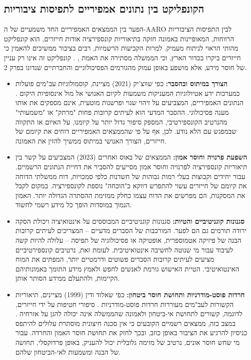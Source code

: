 \documentclass[12pt,a4paper]{article}
\begin{document}
\subsection{הקונפליקט בין נתונים אמפיריים לתפיסות ציבוריות}

הפער בין הממצאים האמפיריים החד משמעיים של ה-AARO לבין התפיסות הציבוריות הרווחות, המאופיינות באמונה חזקה בתיאוריות קונספירציה אודות חייזרים, הוא קונפליקט מהותי הראוי לניתוח מעמיק. למרות הקביעות הרשמיות, רבים בציבור ממשיכים להאמין כי חייזרים ביקרו בכדור הארץ, וכי הממשלה מסתירה את האמת \cite{aaro2024misidentification}, \cite{aaro2024noevidence}. קונפליקט זה אינו רק עניין של חוסר מידע, אלא מושפע באופן עמוק מהגורמים הפסיכולוגיים והחברתיים שנדונו בפרק 2.

\begin{itemize}
    \item \textbf{הצורך במיתוס ובהסבר:} כפי שווצ'יק (2021) מציינת, קוסמולוגיות עב"מים פועלות כמערכות ידע אטיולוגיות המעניקות משמעות לקיום האנושי אל מול אינסופיות היקום \cite{wojcik2021cosmologies}. הנתונים האמפיריים, המצביעים על זיהוי שגוי ופרשנות מוטעית, אינם מספקים את אותו מענה פסיכולוגי. ההסבר המדעי הוא לעיתים קרובות פחות "מרתק" או "משמעותי" מהנרטיב הקונספירטיבי, המספק סיפור גדול יותר על קיומנו, על האיום או התקווה שבמפגש עם הלא נודע. לכן, אף על פי שהממצאים האמפיריים דוחים את קיומם של חייזרים, הצורך האנושי במיתוס ממשיך להזין את האמונה.
    \item \textbf{השפעת פרנויה וחוסר אמון:} הממצאים של באוס ואחרים (2023) המצביעים על קשר בין תיאוריות קונספירציה לפרנויה וחוסר אמון \cite{bowes2023conspiracy} מסייעים להסביר את דחיית הנתונים הרשמיים. עבור יחידים וקבוצות בעלי רמות גבוהות של חשדנות כלפי סמכויות, דוח ממשלתי הדוחה את קיומם של חייזרים עשוי להתפרש דווקא כ"הוכחה" נוספת לקונספירציה. במקום לקבל את המסקנות, הם מפרשים את הדוח עצמו כחלק ממזימת ההסתרה הגדולה יותר. האמון הנמוך במוסדות הופך כל מידע רשמי לחשוד.
    \item \textbf{סגנונות קוגניטיביים והטיות:} סגנונות קוגניטיביים המבוססים על אינטואיציה ויכולת הסקה ירודה \cite{biddlestone2025conspiracy} תורמים גם הם לפער. המורכבות של הסברים מדעיים – המצריכים לעיתים קרובות הבנה של פיזיקה אטמוספרית, אופטיקה או פסיכולוגיה של תפיסה – עלולה להיות קשה לעיבוד עבור מי שנוטה לחשיבה אינטואיטיבית. לעומת זאת, נרטיבים קונספירטיביים מציעים לעיתים קרובות הסברים פשוטים ודרמטיים יותר, המפתים את המוח האינטואיטיבי. הטיית האישוש גורמת לאנשים לחפש ולאמץ מידע התומך באמונותיהם הקיימות, ולהתעלם ממידע הסותר אותן.
    \item \textbf{חרדות פוסט-מודרניות ותחושת חוסר ביטחון:} כפי שאלוד ודין (1999) מציינים, תיאוריות הקשורות לעב"מים מעוררות חרדות פוסט-מודרניות \cite{ellwood1999ufo}. סיפורי חטיפות על ידי חייזרים, לדוגמה, קשורים לתחושת אי-ביטחון ולאמונה שהממשלה אינה יכולה להגן על אזרחיה \cite{ellwood1999ufo}. במצב כזה, ממצאים רשמיים הקובעים כי אין סכנה חיצונית מוסתרת עלולים להיתפס כניסיון להרגיע את הציבור באופן כוזב, ובכך לחזק את תחושת חוסר האמון והחרדה. עבור מי שחש חוסר אונים, נרטיב של מזימה גלובלית יכול להעניק, באופן פרדוקסלי, תחושה של הבנה ומשמעות לאי-הביטחון שלהם.
\end{itemize}
\end{document}
